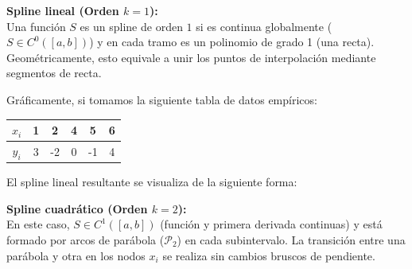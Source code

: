 \textbf{Spline lineal (Orden $k=1$):}\\
Una función $S$ es un spline de orden $1$ si es continua globalmente ($S \in C^0([a,b])$) y en cada tramo es un polinomio de grado 1 (una recta). Geométricamente, esto equivale a unir los puntos de interpolación mediante segmentos de recta.

Gráficamente, si tomamos la siguiente tabla de datos empíricos:
\begin{center}
    \begin{tabular}{|c|ccccc|}
        \hline
        $x_i$ & 1 & 2 & 4 & 5 & 6 \\
        \hline
        $y_i$ & 3 & -2 & 0 & -1 & 4 \\
        \hline
    \end{tabular}
\end{center}

El spline lineal resultante se visualiza de la siguiente forma:
\begin{center}
\end{center}

\textbf{Spline cuadrático (Orden $k=2$):}\\
En este caso, $S \in C^1([a,b])$ (función y primera derivada continuas) y está formado por arcos de parábola ($\mathcal{P}_2$) en cada subintervalo. La transición entre una parábola y otra en los nodos $x_i$ se realiza sin cambios bruscos de pendiente.

